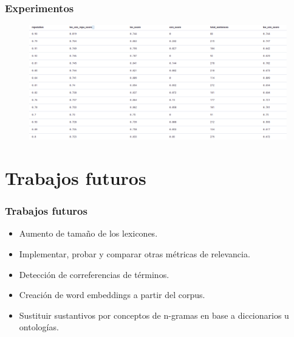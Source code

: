 \documentclass[10pt,fleqn]{beamer}
\begin{document}
\begin{frame} \frametitle{Experimentos} 

\begin{figure}  \centering
  \includegraphics[width=12.5cm, keepaspectratio]{images/kib1.png}
\end{figure}

\end{frame}

\section{Trabajos futuros}
\begin{frame} \frametitle{Trabajos futuros} 
\begin{itemize}
\item Aumento de tamaño de los lexicones.
\item Implementar, probar y comparar otras métricas de relevancia.
\item Detección de correferencias de términos.
\item Creación de word embeddings a partir del corpus.
\item Sustituir sustantivos por conceptos de n-gramas en base a diccionarios u ontologías.

\end{itemize}
\end{frame}
\end{document}
